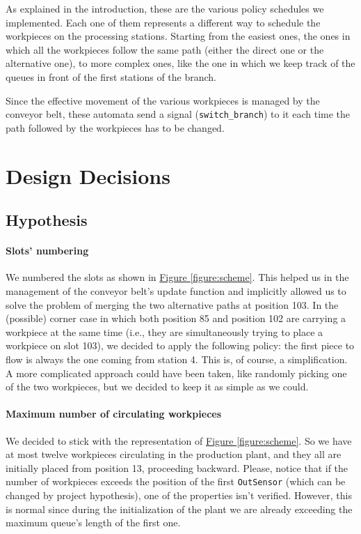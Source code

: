 \documentclass[a4paper]{article}
\newcommand{\figureref}[1]{\textsf{\hyperref[#1]{Figure \ref*{#1}}}}
\begin{document}
    As explained in the introduction, these are the various policy schedules we implemented. Each one of them represents a different way to schedule the workpieces on the processing stations. Starting from the easiest ones, the ones in which all the workpieces follow the same path (either the direct one or the alternative one), to more complex ones, like the one in which we keep track of the queues in front of the first stations of the branch.\medskip

    Since the effective movement of the various workpieces is managed by the conveyor belt, these automata send a signal (\texttt{switch\_branch}) to it each time the path followed by the workpieces has to be changed.

    \section{Design Decisions} \label{section:design_decisions}

    \subsection{Hypothesis}

    \paragraph{Slots' numbering} We numbered the slots as shown in \figureref{figure:scheme}. This helped us in the management of the conveyor belt's update function and implicitly allowed us to solve the problem of merging the two alternative paths at position 103. In the (possible) corner case in which both position 85 and position 102 are carrying a workpiece at the same time (i.e., they are simultaneously trying to place a workpiece on slot 103), we decided to apply the following policy: the first piece to flow is always the one coming from station 4. This is, of course, a simplification. A more complicated approach could have been taken, like randomly picking one of the two workpieces, but we decided to keep it as simple as we could.

    \paragraph{Maximum number of circulating workpieces} We decided to stick with the representation of \figureref{figure:scheme}. So we have at most twelve workpieces circulating in the production plant, and they all are initially placed from position 13, proceeding backward. Please, notice that if the number of workpieces exceeds the position of the first \texttt{OutSensor} (which can be changed by project hypothesis), one of the properties isn't verified. However, this is normal since during the initialization of the plant we are already exceeding the maximum queue's length of the first one.
\end{document}
